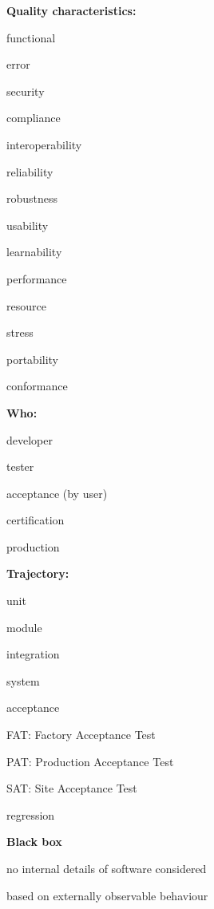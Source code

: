 \textbf{Quality characteristics:}
\begin{multicols}{2}
\begin{itemize*}
	\item functional
	\item error
	\item security
	\item compliance
	\item interoperability
	\item reliability
	\item robustness
	\item usability
	\item learnability
	\item performance
	\item resource
	\item stress
	\item portability
	\item conformance
\end{itemize*}
\end{multicols}

\textbf{Who:}
\begin{itemize*}
	\item developer
	\item tester
    \item acceptance (by user)
	\item certification
	\item production
\end{itemize*}

\textbf{Trajectory:}
\begin{itemize*}
	\item unit
	\item module
	\item integration
	\item system
    \item acceptance
        \begin{itemize*}
            \item FAT\@: Factory Acceptance Test
            \item PAT\@: Production Acceptance Test
            \item SAT\@: Site Acceptance Test
        \end{itemize*}
	\item regression
\end{itemize*}

\textbf{Black box}
\begin{itemize*}
	\item no internal details of software considered
	\item based on externally observable behaviour
\end{itemize*}

